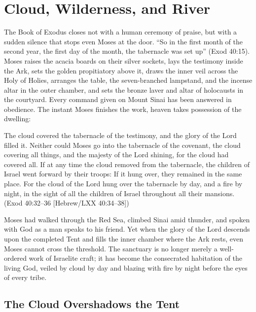 \section{Cloud, Wilderness, and River}
\label{sec:cloud-wilderness-jordan}

The Book of Exodus closes not with a human ceremony of praise, but with a sudden silence that stops even Moses at the door. ``So in the first month of the second year, the first day of the month, the tabernacle was set up'' (Exod 40:15). Moses raises the acacia boards on their silver sockets, lays the testimony inside the Ark, sets the golden propitiatory above it, draws the inner veil across the Holy of Holies, arranges the table, the seven-branched lampstand, and the incense altar in the outer chamber, and sets the bronze laver and altar of holocausts in the courtyard. Every command given on Mount Sinai has been answered in obedience. The instant Moses finishes the work, heaven takes possession of the dwelling:

\begin{scriptureblock}
The cloud covered the tabernacle of the testimony, and the glory of the Lord filled it. Neither could Moses go into the tabernacle of the covenant, the cloud covering all things, and the majesty of the Lord shining, for the cloud had covered all. If at any time the cloud removed from the tabernacle, the children of Israel went forward by their troops: If it hung over, they remained in the same place. For the cloud of the Lord hung over the tabernacle by day, and a fire by night, in the sight of all the children of Israel throughout all their mansions. \textnormal{(Exod 40:32--36 [Hebrew/LXX 40:34--38])}
\end{scriptureblock}

Moses had walked through the Red Sea, climbed Sinai amid thunder, and spoken with God as a man speaks to his friend. Yet when the glory of the Lord descends upon the completed Tent and fills the inner chamber where the Ark rests, even Moses cannot cross the threshold. The sanctuary is no longer merely a well-ordered work of Israelite craft; it has become the consecrated habitation of the living God, veiled by cloud by day and blazing with fire by night before the eyes of every tribe.

\subsection{The Cloud Overshadows the Tent}
\label{subsec:cloud-overshadows-tent}

